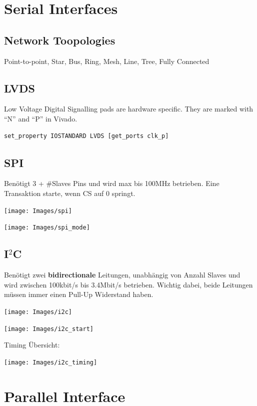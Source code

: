 \section{Serial Interfaces}
\subsection{Network Toopologies}
Point-to-point, Star, Bus, Ring, Mesh, Line, Tree, Fully Connected

\subsection{LVDS}
Low Voltage Digital Signalling pads are hardware specific. They are marked with ``N'' and ``P'' in Vivado.
\begin{lstlisting}
set_property IOSTANDARD LVDS [get_ports clk_p]
\end{lstlisting}


\subsection{SPI}
Benötigt 3 + \#Slaves Pins und wird max bis 100MHz betrieben. Eine Transaktion starte, wenn CS auf 0 springt.
\begin{center}
	\texttt{[image: Images/spi]}
\end{center}
\begin{center}
	\texttt{[image: Images/spi\_mode]}
\end{center}

\subsection{I$^2$C}
Benötigt zwei \textbf{bidirectionale} Leitungen, unabhängig von Anzahl Slaves und wird zwischen 100kbit/s bis 3.4Mbit/s betrieben. Wichtig dabei, beide Leitungen müssen immer einen Pull-Up Widerstand haben.
\begin{center}
	\texttt{[image: Images/i2c]}
\end{center}
\begin{center}
	\texttt{[image: Images/i2c\_start]}
\end{center}

Timing Übersicht:
\begin{center}
	\texttt{[image: Images/i2c\_timing]}
\end{center}

\section{Parallel Interface}
